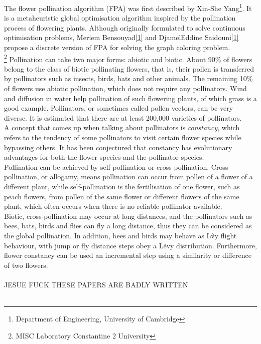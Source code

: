 The flower pollination algorithm\cite{yang2012flower} (FPA) was first described by Xin-She Yang\footnote{Department of Engineering, University of Cambridge}. It is a metaheuristic global optimisation algorithm inspired by the pollination process of flowering plants. Although originally formulated to solve continuous optimisation problems, Meriem Bensouyad\ref{1} and DjamelEddine Saidouni\ref{1} propose a discrete version of FPA for solving the graph coloring problem\cite{7175923}.\\
\footnote{MISC Laboratory Constantine 2 University}\label{1}
Pollination can take two major forms: abiotic and biotic. About 90\% of flowers belong to the class of biotic pollinating flowers, that is, their pollen is transferred by pollinators such as insects, birds, bats and other animals. The remaining 10\% of flowers use abiotic pollination, which does not require any pollinators. Wind and diffusion in water help pollination of such flowering plants, of which grass is a good example. Pollinators, or sometimes called pollen vectors, can be very diverse. It is estimated that there are at least 200,000 varieties of pollinators.\\
A concept that comes up when talking about pollinators is \emph{constancy}, which refers to the tendency of some pollinators to visit certain flower species while bypassing others. It has been conjectured that constancy has evolutionary advantages for both the flower species and the pollinator species.\\
Pollination can be achieved by self-pollination or cross-pollination. Cross-pollination, or allogamy, means pollination can occur from pollen of a flower of a different plant, while self-pollination is the fertilisation of one flower, such as peach flowers, from pollen of the same flower or different flowers of the same plant, which often occurs when there is no reliable pollinator available. %
\\
Biotic, cross-pollination may occur at long distances, and the pollinators such as bees, bats, birds and flies can fly a long distance, thus they can be considered as the global pollination. In addition, bees and birds may behave as L\~vy flight behaviour, with jump or fly distance steps obey a L\~evy distribution. Furthermore, flower constancy can be used an incremental step using a similarity or difference of two flowers.\\~\\
JESUE FUCK THESE PAPERS ARE BADLY WRITTEN\\~\\


